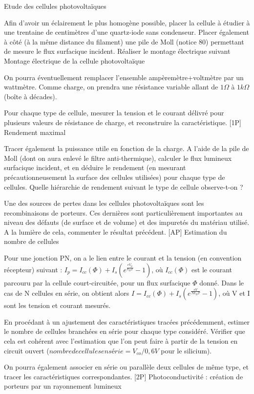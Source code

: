 \documentclass{article}%
\begin{document}
Etude des cellules photovoltaïques

Afin d'avoir un éclairement le plus homogène possible, placer la cellule à étudier à une trentaine de centimètres d'une quartz-iode sans condenseur. Placer également à côté (à la même distance du filament) une pile de Moll (notice 80) permettant de mesure le flux surfacique incident. Réaliser le montage électrique suivant
Montage électrique de la cellule photovoltaïque

On pourra éventuellement remplacer l'ensemble ampèremètre+voltmètre par un wattmètre. Comme charge, on prendra une résistance variable allant de $1 \Omega$ à $1 k\Omega$ (boîte à décades).

Pour chaque type de cellule, mesurer la tension et le courant délivré pour plusieurs valeurs de résistance de charge, et reconstruire la caractéristique.
[1P] Rendement maximal

Tracer également la puissance utile en fonction de la charge. A l'aide de la pile de Moll (dont on aura enlevé le filtre anti-thermique), calculer le flux lumineux surfacique incident, et en déduire le rendement (en mesurant précautionneusement la surface des cellules utilisées) pour chaque type de cellules. Quelle hiérarchie de rendement suivant le type de cellule observe-t-on ?

Une des sources de pertes dans les cellules photovoltaïques sont les recombinaisons de porteurs. Ces dernières sont particulièrement importantes au niveau des défauts (de surface et de volume) et des impuretés du matériau utilisé. A la lumière de cela, commenter le résultat précédent.
[AP] Estimation du nombre de cellules

Pour une jonction PN, on a le lien entre le courant et la tension (en convention récepteur) suivant : $I_p=I_{cc}(\Phi)+I_{s} \left( e^{\frac{eV_p}{k_BT}}-1 \right)$, où $I_{cc}(\Phi)$ est le courant parcouru par la cellule court-circuitée, pour un flux surfacique $\Phi$ donné. Dans le cas de N cellules en série, on obtient alors $I=I_{cc}(\Phi)+I_{s} \left( e^{\frac{eV}{Nk_BT}}-1 \right)$, où V et I sont les tension et courant mesurés.


En procédant à un ajustement des caractéristiques tracées précédemment, estimer le nombre de cellules branchées en série pour chaque type considéré. Vérifier que cela est cohérent avec l'estimation que l'on peut faire à partir de la tension en circuit ouvert ($nombre de cellules en série = V_{co}/0,6V$ pour le silicium).

On pourra également associer en série ou parallèle deux cellules de même type, et tracer les caractéristiques correspondantes.
[2P] Photoconductivité : création de porteurs par un rayonnement lumineux
\end{document}
